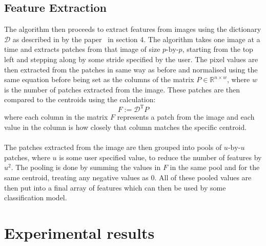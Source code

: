 \documentclass{article}
\begin{document}
\subsection{Feature Extraction}

The algorithm then proceeds to extract features from images using the dictionary $\mathcal{D}$ as described in by the paper~\cite{paper} in section 4. The algorithm takes one image at a time and extracts patches from that image of size $p\textrm{-by-}p$, starting from the top left and stepping along by some stride specified by the user. The pixel values are then extracted from the patches in same way as before and normalised using the same equation before being set as the columns of the matrix $P \in \mathbb{R}^{n \times w}$, where $w$ is the number of patches extracted from the image. These patches are then compared to the centroids using the calculation:
\[
F := \mathcal{D}^{\mathrm{T}}P
\]
where each column in the matrix $F$ represents a patch from the image and each value in the column is how closely that column matches the specific centroid.

\paragraph*{}

The patches extracted from the image are then grouped into pools of $u\textrm{-by-}u$ patches, where $u$ is some user specified value, to reduce the number of features by $u^2$. The pooling is done by summing the values in $F$ in the same pool and for the same centroid, treating any negative values as 0. All of these pooled values are then put into a final array of features which can then be used by some classification model.

\section{Experimental results}
\end{document}
